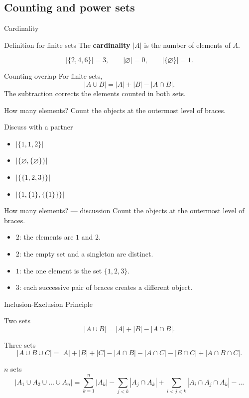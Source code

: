 \documentclass{beamer}
\begin{document}
\subsection{Counting and power sets}
\begin{frame}{Cardinality}
\begin{block}{Definition for finite sets}
The \textbf{cardinality} $|A|$ is the number of elements of $A$.
\end{block}\[|\{2,4,6\}|=3,\qquad|\varnothing|=0,\qquad|\{\varnothing\}|=1.\]
\begin{block}{Counting overlap}
For finite sets,\[|A\cup B|=|A|+|B|-|A\cap B|.\]The subtraction corrects the elements counted in both sets.
\end{block}
\end{frame}
\begin{frame}{How many elements?}
Count the objects at the outermost level of braces.
\begin{block}{Discuss with a partner}
\begin{itemize}
\item $|\{1,1,2\}|$
\item $|\{\varnothing,\{\varnothing\}\}|$
\item $|\{\{1,2,3\}\}|$
\item $|\{1,\{1\},\{\{1\}\}\}|$
\end{itemize}
\end{block}
\end{frame}
\begin{frame}{How many elements? --- discussion}
Count the objects at the outermost level of braces.
\begin{itemize}
\item $2$: the elements are $1$ and $2$.
\item $2$: the empty set and a singleton are distinct.
\item $1$: the one element is the set $\{1,2,3\}$.
\item $3$: each successive pair of braces creates a different object.
\end{itemize}
\end{frame}
\begin{frame}{Inclusion-Exclusion Principle}
\begin{block}{Two sets}
\[|A\cup B|=|A|+|B|-|A\cap B|.\]
\end{block}
\begin{block}{Three sets}
\[|A\cup B\cup C|=|A|+|B|+|C|-|A\cap B|-|A\cap C|-|B\cap C|+|A\cap B\cap C|.\]
\end{block}
\begin{block}{$n$ sets}
\[|A_1\cup A_2\cup\dots \cup A_n|=\sum_{k=1}^n|A_k|-\sum_{j<k}|A_j\cap A_k|+\sum_{i < j < k} |A_i\cap A_j\cap A_k|-\dots\]
\end{block}
\end{frame}
\end{document}
